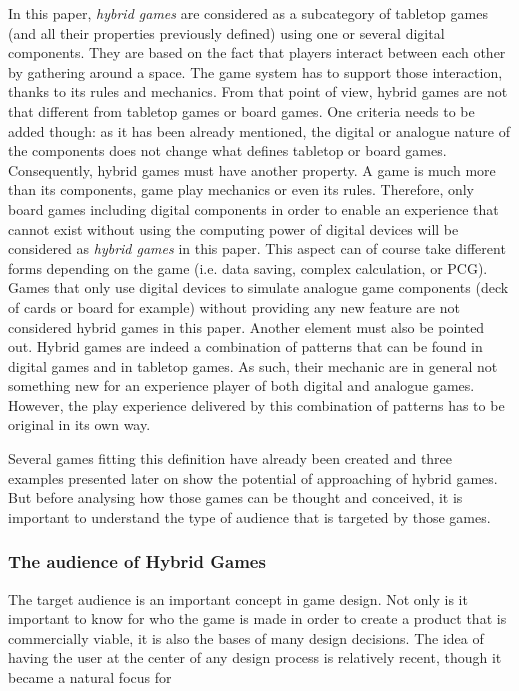 In this paper, \textit{hybrid games} are considered as a subcategory of tabletop games (and all their properties previously defined) using one or several digital components. They are based on the fact that players interact between each other by gathering around a space. The game system has to support those interaction, thanks to its rules and mechanics. From that point of view, hybrid games are not that different from tabletop games or board games. One criteria needs to be added though: as it has been already mentioned, the digital or analogue nature of the components does not change what defines tabletop or board games. Consequently, hybrid games must have another property. A game is much more than its components, game play mechanics or even its rules. Therefore, only board games including digital components in order to enable an experience that cannot exist without using the computing power of digital devices will be considered as \textit{hybrid games} in this paper. This aspect can of course take different forms depending on the game (i.e. data saving, complex calculation, or PCG). Games that only use digital devices to simulate analogue game components (deck of cards or board for example) without providing any new feature are not considered hybrid games in this paper. Another element must also be pointed out. Hybrid games are indeed a combination of patterns that can be found in digital games and in tabletop games. As such, their mechanic are in general not something new for an experience player of both digital and analogue games. However, the play experience delivered by this combination of patterns has to be original in its own way.

Several games fitting this definition have already been created and three examples presented later on show the potential of approaching of hybrid games. But before analysing how those games can be thought and conceived, it is important to understand the type of audience that is targeted by those games.
\subsubsection{The audience of Hybrid Games}
The target audience is an important concept in game design. Not only is it important to know for who the game is made in order to create a product that is commercially viable, it is also the bases of many design decisions. The idea of having the user at the center of any design process is relatively recent, though it became a natural focus for

